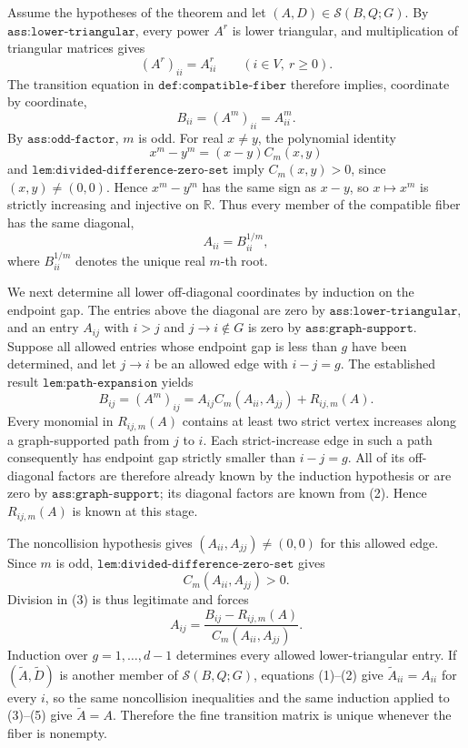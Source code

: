 Assume the hypotheses of the theorem and let \((A,D)\in\mathcal S(B,Q;G)\).  By \(\texttt{ass:lower-triangular}\), every power \(A^r\) is lower triangular, and multiplication of triangular matrices gives
\[
(A^r)_{ii}=A_{ii}^r \qquad (i\in V,\ r\geq 0).
\]
The transition equation in \(\texttt{def:compatible-fiber}\) therefore implies, coordinate by coordinate,
\[
B_{ii}=(A^m)_{ii}=A_{ii}^m. \tag{1}
\]
By \(\texttt{ass:odd-factor}\), \(m\) is odd.  For real \(x\neq y\), the polynomial identity
\[
x^m-y^m=(x-y)C_m(x,y)
\]
and \(\texttt{lem:divided-difference-zero-set}\) imply \(C_m(x,y)>0\), since \((x,y)\neq(0,0)\).  Hence \(x^m-y^m\) has the same sign as \(x-y\), so \(x\mapsto x^m\) is strictly increasing and injective on \(\mathbb R\).  Thus every member of the compatible fiber has the same diagonal,
\[
A_{ii}=B_{ii}^{1/m}, \tag{2}
\]
where \(B_{ii}^{1/m}\) denotes the unique real \(m\)-th root.

We next determine all lower off-diagonal coordinates by induction on the endpoint gap.  The entries above the diagonal are zero by \(\texttt{ass:lower-triangular}\), and an entry \(A_{ij}\) with \(i>j\) and \(j\to i\notin G\) is zero by \(\texttt{ass:graph-support}\).  Suppose all allowed entries whose endpoint gap is less than \(g\) have been determined, and let \(j\to i\) be an allowed edge with \(i-j=g\).  The established result \(\texttt{lem:path-expansion}\) yields
\[
B_{ij}=(A^m)_{ij}
=A_{ij}C_m(A_{ii},A_{jj})+R_{ij,m}(A). \tag{3}
\]
Every monomial in \(R_{ij,m}(A)\) contains at least two strict vertex increases along a graph-supported path from \(j\) to \(i\).  Each strict-increase edge in such a path consequently has endpoint gap strictly smaller than \(i-j=g\).  All of its off-diagonal factors are therefore already known by the induction hypothesis or are zero by \(\texttt{ass:graph-support}\); its diagonal factors are known from (2).  Hence \(R_{ij,m}(A)\) is known at this stage.

The noncollision hypothesis gives \((A_{ii},A_{jj})\neq(0,0)\) for this allowed edge.  Since \(m\) is odd, \(\texttt{lem:divided-difference-zero-set}\) gives
\[
C_m(A_{ii},A_{jj})>0. \tag{4}
\]
Division in (3) is thus legitimate and forces
\[
A_{ij}
=\frac{B_{ij}-R_{ij,m}(A)}{C_m(A_{ii},A_{jj})}. \tag{5}
\]
Induction over \(g=1,\ldots,d-1\) determines every allowed lower-triangular entry.  If \((\widetilde A,\widetilde D)\) is another member of \(\mathcal S(B,Q;G)\), equations (1)--(2) give \(\widetilde A_{ii}=A_{ii}\) for every \(i\), so the same noncollision inequalities and the same induction applied to (3)--(5) give \(\widetilde A=A\).  Therefore the fine transition matrix is unique whenever the fiber is nonempty.

